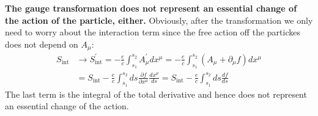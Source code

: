 \textbf{The gauge transformation does not represent an essential change of the action of the particle, either.} Obviously, after the transformation we only need to worry about the interaction term since the free action off the partickes does not depend on $A_{\mu}$:
$$
\begin{aligned}
S_{\mathrm{int}} & \rightarrow S_{\mathrm{int}}^{\prime}=-\frac{e}{c} \int_{s_{1}}^{s_{2}} A_{\mu}^{\prime} d x^{\mu}=-\frac{e}{c} \int_{s_{1}}^{s_{2}}\left(A_{\mu}+\partial_{\mu} f\right) d x^{\mu} \\
&=S_{\mathrm{int}}-\frac{e}{c} \int_{s_{1}}^{s_{2}} d s \frac{\partial f}{\partial x^{\mu}} \frac{d x^{\mu}}{d s}=S_{\mathrm{int}}-\frac{e}{c} \int_{s_{1}}^{s_{2}} d s \frac{d f}{d s}
\end{aligned}
$$
The last term is the integral of the total derivative and hence does not represent an
essential change of the action.

